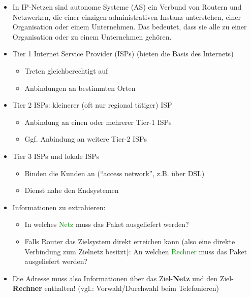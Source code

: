 
\begin{itemize}
    \item In IP-Netzen sind autonome Systeme (AS) ein Verbund von Routern und Netzwerken, die einer einzigen administrativen Instanz unterstehen, einer Organisation oder einem Unternehmen. Das bedeutet, dass sie alle zu einer Organisation oder zu einem Unternehmen gehören.
\end{itemize}

\begin{itemize}
    \item Tier 1 Internet Service Provider (ISPs) (bieten die Basis des Internets)
    \begin{itemize}
        \item Treten gleichberechtigt auf
        \item Anbindungen an bestimmten Orten
    \end{itemize}
    \item Tier 2 ISPs: kleinerer (oft nur regional tätiger) ISP
    \begin{itemize}
        \item Anbindung an einen oder mehrerer Tier-1 ISPs
        \item Ggf. Anbindung an weitere Tier-2 ISPs
    \end{itemize}
    \item Tier 3 ISPs und lokale ISPs
    \begin{itemize}
        \item Binden die Kunden an (“access network”, z.B. über DSL)
        \item Dienst nahe den Endsystemen
    \end{itemize}
\end{itemize}

\begin{itemize}
    \item Informationen zu extrahieren:
    \begin{itemize}
        \item In welches \textcolor{green}{Netz} muss das Paket ausgeliefert werden?
        \item Falls Router das Zielsystem direkt erreichen kann (also eine direkte Verbindung zum Zielnetz besitzt): An welchen \textcolor{green}{Rechner} muss das Paket ausgeliefert werden?
    \end{itemize}
    \item Die Adresse muss also Informationen über das Ziel-\textbf{Netz} und den Ziel-\textbf{Rechner} enthalten! (vgl.: Vorwahl/Durchwahl beim Telefonieren)
\end{itemize}

